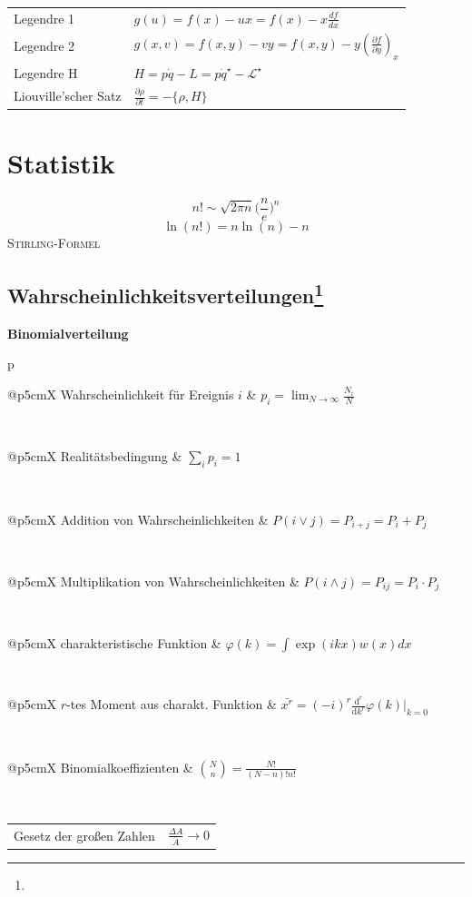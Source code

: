 \documentclass[12pt,a4paper, twoside]{article}
\makeatletter
\renewcommand{\d}[2]{\frac{d #1}{d #2}}
\newcommand{\pd}[2]{\frac{\partial #1}{\partial #2}}
\renewcommand{\=}[1]{\stackrel{#1}{=}}
\theoremstyle{definition}
\theoremstyle{remark}
\newcommand{\concept}[2]{%
\noindent
\begin{framed}
\noindent\textbf{#1}
\par\begin{tabular}{p{\linewidth}}
#2
\end{tabular}
\end{framed}
}
\newcommand{\f}[2]{%
\noindent\begin{tabularx}{\linewidth}{@{}p{5cm}X}
#1 & $#2$
\end{tabularx}}
\makeatother
\begin{document}
\begin{center}
\begin{framed}
\noindent\begin{tabular}{ll}
Legendre 1 & $g(u) = f(x) -ux = f(x) - x \d{f}{x}$\\
Legendre 2 & $g(x,v) = f(x,y) - vy = f(x,y) - y (\pd{f}{y})_x$\\
Legendre H & $H = p\dot{q} - L = p \dot{q}^\star-\mathscr{L}^\star$\\
Liouville'scher Satz & $\pd{\rho}{t} = -\{\rho, H\}$\\
\end{tabular}
\end{framed}
\end{center}

\newpage
\section{Statistik}

\begin{framed}
$$n! \sim \sqrt{2\pi n} \Big(\frac{n}{e}\Big)^n$$
$$\ln(n!) = n \ln(n) - n$$
\centering\textsc{Stirling-Formel}
\end{framed}


\subsection[Wahrscheinlichkeitsverteilungen]{Wahrscheinlichkeitsverteilungen\let\thefootnote\relax\footnote{}}

\concept{Binomialverteilung}{

\f{Wahrscheinlichkeit für Ereignis $i$}{p_i = \lim_{N \rightarrow \infty} \frac{N_i}{N}}\\
\f{Realitätsbedingung}{\sum_i p_i = 1}\\
\f{Addition von Wahrscheinlichkeiten}{P(i \lor j) = P_{i+j} = P_i + P_j}\\
\f{Multiplikation von Wahrscheinlichkeiten}{P(i \land j) = P_{ij} = P_i \cdot P_j}\\
\f{charakteristische Funktion}{\varphi (k) = \int \exp(ikx) w(x) dx}\\
\f{$r$-tes Moment aus charakt. Funktion}{\bar{x^r} = (-i)^r \frac{\text{d}^r}{\text{d}k^r} \varphi(k)|_{k=0}}\\
\f{Binomialkoeffizienten}{{N \choose n} = \frac{N!}{(N-n)! n!}}\\
\f{Gesetz der großen Zahlen}{\frac{\Delta A}{\bar A} \longrightarrow 0}
}
\end{document}
